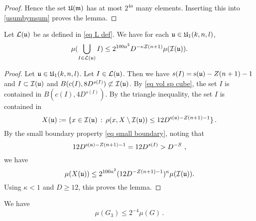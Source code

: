 {\begin{proof}
Hence the set $\mathfrak U(\mathfrak{m})$ has at most
$2^{4a}$ many elements.
Inserting this into \eqref{usumbymsum} proves the lemma.
\end{proof}

\begin{lemma}\label{boundary exception}
Let $\mathcal{L}(\mathfrak u)$ be as defined in \eqref{eq L def}. We have for each $\mathfrak u\in \mathfrak U_1(k,n,l)$,
\begin{equation}
\mu(\bigcup_{I\in \mathcal{L}(\mathfrak u)} I)
\le 2^{100a^2} D^{-\kappa Z(n+1)}
        \mu(\mathcal{I}(\mathfrak{u})).
\end{equation}

\end{lemma}


\begin{proof}
  Let $\mathfrak u\in \mathfrak U_1(k,n,l)$.
Let $I \in \mathcal{L}(\mathfrak u)$. Then we have $s(I) = \mathrm{s}(\mathfrak u) - Z(n+1) - 1$ and $I \subset \mathcal{I}(\mathfrak u)$ and $B(c(I), 8D^{s(I)}) \not \subset \mathcal{I}(\mathfrak u)$.
By \eqref{eq vol sp cube}, the set $I$
is contained in $B(c(I), 4D^{s(I)})$.
By the triangle inequality, the set $I$
is contained in
\begin{equation}
    X(\mathfrak u):=\{x \in \mathcal{I}(\mathfrak u) \, : \, \rho(x, X \setminus \mathcal{I}(\mathfrak u)) \leq 12 D^{\mathrm{s}(\mathfrak u) - Z(n+1)-1}\}\,.
\end{equation}
 By the small boundary property \eqref{eq small boundary}, noting that
 \begin{equation*}
     12D^{\mathrm{s}(\mathfrak u) - Z(n+1) - 1} = 12D^{s(I)} > D^{-S}\ ,
 \end{equation*} we have
   $$
        \mu(X(\mathfrak u)) \le
        2^{100a^2}(12 D^{-Z(n+1)-1})^\kappa
        \mu(\mathcal{I}(\mathfrak{u})).
    $$
Using $\kappa<1$ and $D \ge 12$, this proves the lemma.
\end{proof}














    \begin{lemma}\label{third exception}

       We have
\begin{equation}
    \mu(G_3)\le 2^{-4} \mu(G)\, .
\end{equation}
    \end{lemma}



}
